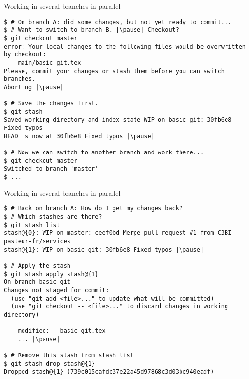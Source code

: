 \begin{frame}[fragile]{Working in several branches in parallel}
	\begin{tiny}
		\begin{lstlisting}
$ # On branch A: did some changes, but not yet ready to commit...
$ # Want to switch to branch B. |\pause| Checkout?
$ git checkout master
error: Your local changes to the following files would be overwritten by checkout:
	main/basic_git.tex
Please, commit your changes or stash them before you can switch branches.
Aborting |\pause|

$ # Save the changes first.
$ git stash
Saved working directory and index state WIP on basic_git: 30fb6e8 Fixed typos
HEAD is now at 30fb6e8 Fixed typos |\pause|

$ # Now we can switch to another branch and work there...
$ git checkout master
Switched to branch 'master'
$ ...
		\end{lstlisting}
	\end{tiny}
\end{frame}

\begin{frame}[fragile]{Working in several branches in parallel}
	\begin{tiny}
		\begin{lstlisting}
$ # Back on branch A: How do I get my changes back?
$ # Which stashes are there?
$ git stash list
stash@{0}: WIP on master: ceef0bd Merge pull request #1 from C3BI-pasteur-fr/services
stash@{1}: WIP on basic_git: 30fb6e8 Fixed typos |\pause|

$ # Apply the stash
$ git stash apply stash@{1}
On branch basic_git
Changes not staged for commit:
  (use "git add <file>..." to update what will be committed)
  (use "git checkout -- <file>..." to discard changes in working directory)

	modified:   basic_git.tex
	... |\pause|
	
$ # Remove this stash from stash list
$ git stash drop stash@{1}
Dropped stash@{1} (739c015cafdc37e22a45d97868c3d03bc940eadf)
		\end{lstlisting}
	\end{tiny}
\end{frame}